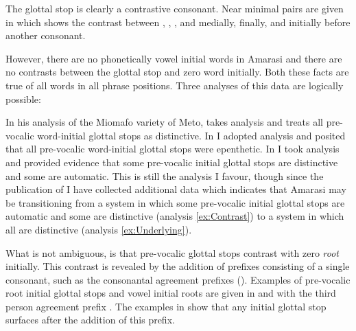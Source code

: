 The glottal stop is clearly a contrastive consonant.
Near minimal pairs are given in 
which shows the contrast between , , , and {\0}
medially, finally, and initially before another consonant.

However, there are no phonetically vowel initial words in Amarasi
and there are no contrasts between the glottal stop and zero word initially.
Both these facts are true of all words in all phrase positions.
Three analyses of this data are logically possible:

\begin{exe}
	\label{ex:AnaIniGloSto}
\end{exe}

In his analysis of the Miomafo variety of Meto, \cite{st93,st96}
takes analysis  and treats all pre-vocalic word-initial
glottal stops as distinctive.
In \cite{ed16,ed16b} I adopted analysis  and posited that all
pre-vocalic word-initial glottal stops were epenthetic.
In \cite{ed17} I took analysis 
and provided evidence that some pre-vocalic initial
glottal stops are distinctive and some are automatic.
This is still the analysis I favour,
though since the publication of \cite{ed17}
I have collected additional data which indicates that Amarasi
may be transitioning from a system in which
some pre-vocalic initial glottal stops are automatic and some are distinctive
(analysis \ref{ex:Contrast}) to a system in which all are distinctive (analysis \ref{ex:Underlying}).

What is not ambiguous, is that pre-vocalic glottal
stops contrast with zero \emph{root} initially.
This contrast is revealed by the addition
of prefixes consisting of a single consonant,
such as the consonantal agreement prefixes ().
Examples of pre-vocalic root initial glottal stops
and vowel initial roots are given in 
and  with the third person agreement prefix .
The examples in  show that
any initial glottal stop surfaces after the addition of this prefix.

